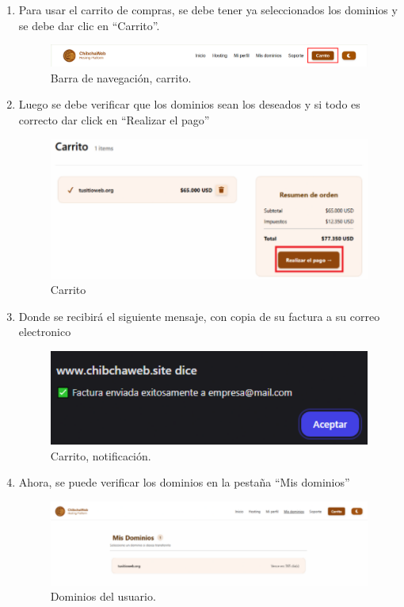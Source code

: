 \begin{enumerate}
    \item Para usar el carrito de compras, se debe tener ya seleccionados los dominios y se debe dar clic en “Carrito”.
    \begin{figure}[H]
        \centering
    \includegraphics[width=0.8\linewidth]{guiamodulo/navbar-carrito.png}
    \caption{Barra de navegación, carrito.}
    \label{fig:navbar-carrito}
    \end{figure}

    \item Luego se debe verificar que los dominios sean los deseados y si todo es correcto dar click en “Realizar el pago”
    \begin{figure}[H]
        \centering
    \includegraphics[width=0.8\linewidth]{guiamodulo/carrito-pago.png}
    \caption{Carrito}
    \label{fig:carrito-pago}
    \end{figure}

    \item Donde se recibirá el siguiente mensaje, con copia de su factura a su correo electronico
    \begin{figure}[H]
        \centering
    \includegraphics[width=0.5\linewidth]{guiamodulo/carrito-aviso.png}
    \caption{Carrito, notificación.}
    \label{fig:carrito-aviso}
    \end{figure}

    \item Ahora, se puede verificar los dominios en la pestaña “Mis dominios”
    \begin{figure}[H]
        \centering
    \includegraphics[width=0.8\linewidth]{guiamodulo/domino-usuario.png}
    \caption{Dominios del usuario.}
    \label{fig:domino-usuario}
    \end{figure}

\end{enumerate}
